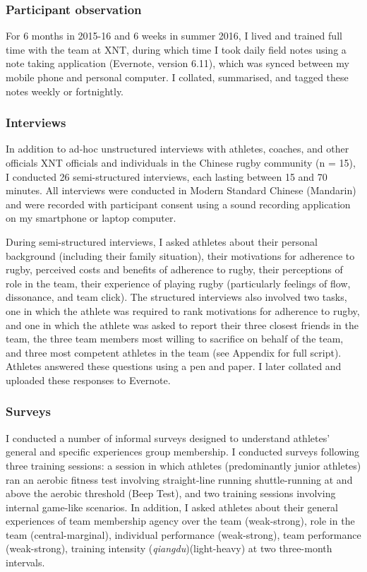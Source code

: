 \subsubsection{Participant observation}
For 6 months in 2015-16 and 6 weeks in summer 2016, I lived and trained full time with the team at XNT, during which time I took daily field notes using a note taking application (Evernote, version 6.11), which was synced between my mobile phone and personal computer. I collated, summarised, and tagged these notes weekly or fortnightly.

\subsubsection{Interviews}
In addition to ad-hoc unstructured interviews with athletes, coaches, and other officials XNT officials and individuals in the Chinese rugby community (n = 15), I conducted 26 semi-structured interviews, each lasting between 15 and 70 minutes.  All interviews were conducted in Modern Standard Chinese (Mandarin) and were recorded with participant consent using a sound recording application on my smartphone or laptop computer.

During semi-structured interviews, I asked athletes about their personal background (including their family situation), their motivations for adherence to rugby, perceived costs and benefits of adherence to rugby, their perceptions of role in the team, their experience of playing rugby (particularly feelings of flow, dissonance, and team click).  The structured interviews also involved two tasks, one in which the athlete was required to rank motivations for adherence to rugby, and one in which the athlete was asked to report their three closest friends in the team, the three team members most willing to sacrifice on behalf of the team, and three most competent athletes in the team (see Appendix for full script). Athletes answered these questions using a pen and paper. I later collated and uploaded these responses to Evernote.


\subsubsection{Surveys}
 I conducted a number of informal surveys designed to understand athletes' general and specific experiences group membership.  I conducted surveys following three training sessions: a session in which athletes (predominantly junior athletes) ran an aerobic fitness test involving straight-line running shuttle-running at and above the aerobic threshold (Beep Test), and two training sessions involving internal game-like scenarios.  In addition, I asked athletes about their general experiences of team membership agency over the team (weak-strong), role in the team (central-marginal), individual performance (weak-strong), team performance (weak-strong), training intensity (\textit{qiangdu})(light-heavy) at two three-month intervals.














